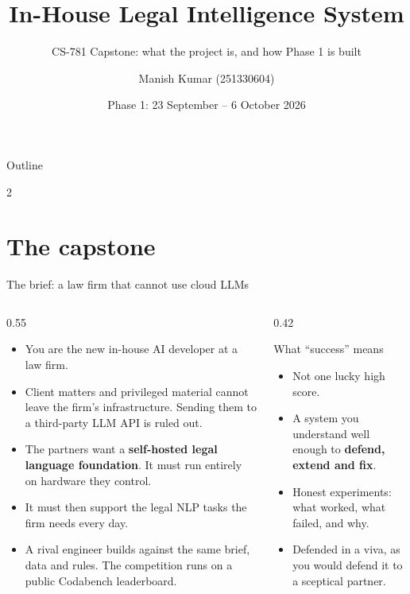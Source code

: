 \documentclass[aspectratio=169,11pt]{beamer}
\title[CS-781 Capstone: Phase 1]{In-House Legal Intelligence System}
\subtitle{CS-781 Capstone: what the project is, and how Phase 1 is built}
\author[Manish Kumar]{Manish Kumar (251330604)}
\institute{CS-781, IIT Kanpur}
\date{Phase 1: 23 September -- 6 October 2026}
\begin{document}
\begin{frame}
  \titlepage
\end{frame}

\begin{frame}{Outline}
  \begin{multicols}{2}
  \tableofcontents
  \end{multicols}
\end{frame}

\section{The capstone}

\begin{frame}{The brief: a law firm that cannot use cloud LLMs}
  \begin{columns}[T]
    \begin{column}{0.55\textwidth}
      \begin{itemize}
        \item You are the new in-house AI developer at a law firm.
        \item Client matters and privileged material \alert{cannot leave the firm's infrastructure}.
              Sending them to a third-party LLM API is ruled out.
        \item The partners want a \textbf{self-hosted legal language foundation}.
              It must run entirely on hardware they control.
        \item It must then support the legal NLP tasks the firm needs every day.
        \item A rival engineer builds against the same brief, data and rules.
              The competition runs on a public Codabench leaderboard.
      \end{itemize}
    \end{column}
    \begin{column}{0.42\textwidth}
      \begin{block}{What ``success'' means}
        \begin{itemize}\small
          \item Not one lucky high score.
          \item A system you understand well enough to \textbf{defend, extend and fix}.
          \item Honest experiments: what worked, what failed, and why.
          \item Defended in a viva, as you would defend it to a sceptical partner.
        \end{itemize}
      \end{block}
    \end{column}
  \end{columns}
\end{frame}
\end{document}
